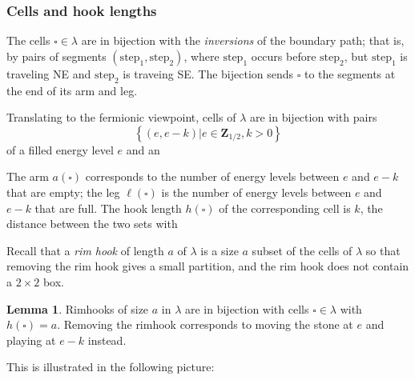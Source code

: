 \documentclass{amsart}[12pt]
\theoremstyle{definition}
\newtheorem{lemma}[dummy]{Lemma}
\newcommand{\Z}{\mathbf{Z}}
\begin{document}
\subsubsection{Cells and hook lengths}

The cells $\square\in\lambda$ are in bijection with the
\emph{inversions} of the boundary path; that is, by pairs of segments
$(\text{step}_1, \text{step}_2)$, where $\text{step}_1$ occurs before $\text{step}_2$,
but $\text{step}_1$ is traveling NE and $\text{step}_2$ is traveing SE.  The bijection
sends $\square$ to the segments at the end of its arm and leg.

Translating to the fermionic viewpoint, cells of $\lambda$ are in
bijection with pairs 
$$\left\{(e, e-k)\big | e\in\Z_{1/2}, k>0\right\}$$ of a filled energy level $e$ and an


The arm $a(\square)$ corresponds to the number of energy levels between $e$ and $e-k$ that are empty; the leg $\ell(\square)$ is the number of energy levels between $e$ and $e-k$ that are full.  The hook length $h(\square)$ of the corresponding cell is $k$, the distance between the two sets with 

Recall that a \emph{rim hook} of length $a$ of $\lambda$ is a size $a$ subset of the cells of $\lambda$ so that removing the rim hook gives a small partition, and the rim hook does not contain a $2\times 2$ box.  

\begin{lemma} \label{lem:rimhooks}
Rimhooks of size $a$ in $\lambda$ are in bijection with cells $\square\in\lambda$ with $h(\square)=a$.  Removing the rimhook corresponds to moving the stone at $e$ and playing at $e-k$ instead.
\end{lemma}

This is illustrated in the following picture:
\end{document}
